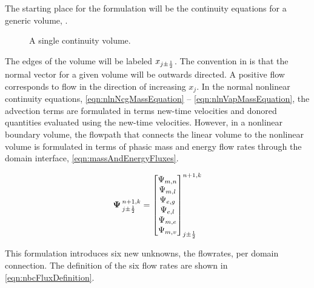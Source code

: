 The starting place for the formulation will be the continuity equations for a generic volume,  .

\begin{figure}[ht!]
\centering

\caption{A single continuity volume.}
\label{fig:single3dvol}
\end{figure}

The edges of the volume will be labeled $x_{j \pm \onehalf}$.
The convention in \cobra{} is that the normal vector for a given volume will be outwards directed.
A positive flow corresponds to flow in the direction of increasing $x_{j}$.
In the normal nonlinear continuity equations, \eqref{eqn:nlnNcgMassEquation} -- \eqref{eqn:nlnVapMassEquation}, the advection terms are formulated in terms new-time velocities and donored quantities evaluated using the new-time velocities.
However, in a nonlinear boundary volume, the flowpath that connects the linear volume to the nonlinear volume is formulated in terms of phasic mass and energy flow rates through the domain interface, \eqref{eqn:massAndEnergyFluxes}.

\begin{equation}
\label{eqn:massAndEnergyFluxes}
\vec{\Psi}^{n+1, k}_{j \pm \onehalf} = \begin{bmatrix}
\Psi_{m, n} \\
\Psi_{m, l} \\
\Psi_{e, g} \\
\Psi_{e, l} \\
\Psi_{m, e} \\
\Psi_{m, v} \\
\end{bmatrix}^{n+1, k}_{j \pm \onehalf}
\end{equation}

This formulation introduces six new unknowns, the flowrates, per domain connection.
The definition of the six flow rates are shown in \eqref{eqn:nbcFluxDefinition}.

